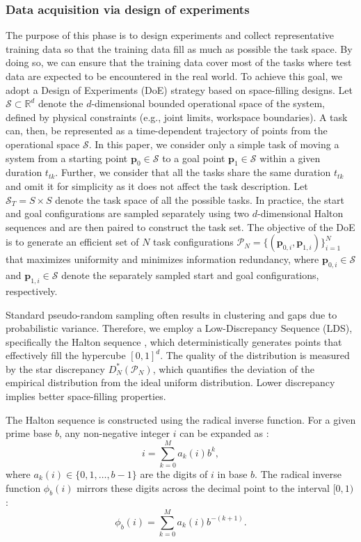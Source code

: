 \documentclass[a4paper,10pt]{cas-sc}%
\newcommand{\rev}[1]{\textcolor{revisionred}{#1}}
\begin{document}
\subsubsection{Data acquisition via design of experiments}\label{sec3.2.1}

\rev{
	The purpose of this phase is to design experiments and collect representative training data so that the training data fill as much as possible the task space. By doing so, we can ensure that the training data cover most of the tasks where test data are expected to be encountered in the real world. To achieve this goal, we adopt a Design of Experiments (DoE) strategy based on space-filling designs. Let $\mathcal{S} \subset \mathbb{R}^d$ denote the $d$-dimensional bounded operational space of the system, defined by physical constraints (e.g., joint limits, workspace boundaries). A task can, then, be represented as a time-dependent trajectory of points from the operational space $\mathcal{S}.$ In this paper, we consider only a simple task of moving a system from a starting point $\mathbf{p}_0 \in \mathcal{S}$ to a goal point $\mathbf{p}_1 \in \mathcal{S}$ within a given duration $t_{tk}$. Further, we consider that all the tasks share the same duration $t_{tk}$ and omit it for simplicity as it does not affect the task description. Let $\mathcal{S}_T = S\times S$ denote the task space of all the possible tasks. In practice, the start and goal configurations are sampled separately using two $d$-dimensional Halton sequences and are then paired to construct the task set. 
	The objective of the DoE is to generate an efficient set of $N$ task configurations
	$\mathcal{P}_N=\{(\mathbf{p}_{0,i},\mathbf{p}_{1,i})\}_{i=1}^{N}$
	that maximizes uniformity and minimizes information redundancy, where
	$\mathbf{p}_{0,i}\in\mathcal{S}$ and
	$\mathbf{p}_{1,i}\in\mathcal{S}$
	denote the separately sampled start and goal configurations, respectively.
}

Standard pseudo-random sampling often results in clustering and gaps due to probabilistic variance. Therefore, we employ a Low-Discrepancy Sequence (LDS), specifically the Halton sequence \citep{chi2005optimal}, which deterministically generates points that effectively fill the hypercube $[0, 1]^d$. The quality of the distribution is measured by the star discrepancy $D_N^*(\mathcal{P}_N)$, which quantifies the deviation of the empirical distribution from the ideal uniform distribution. Lower discrepancy implies better space-filling properties.

The Halton sequence is constructed using the radical inverse function. For a given prime base $b$, any non-negative integer $i$ can be expanded as \citep{chi2005optimal}:
\begin{equation}
	i = \sum_{k=0}^{M} a_k(i) b^k,
\end{equation}
where $a_k(i) \in \{0, 1, \dots, b-1\}$ are the digits of $i$ in base $b$. The radical inverse function $\phi_b(i)$ mirrors these digits across the decimal point to the interval $[0, 1)$:
\begin{equation}
	\phi_b(i) = \sum_{k=0}^{M} a_k(i) b^{-(k+1)}.
\end{equation}
\end{document}
